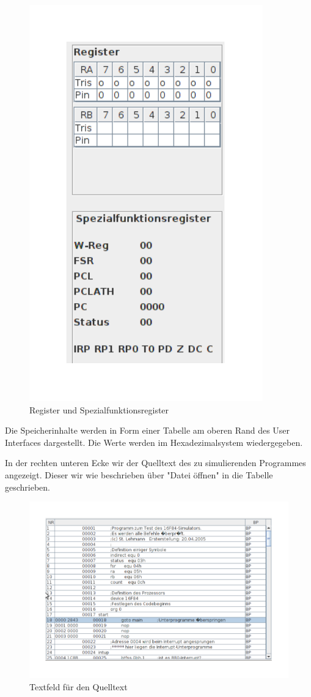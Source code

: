\begin{figure}[h]
\centering
\includegraphics[scale=0.5]{Bilder/Register.pdf}
\caption{Register und Spezialfunktionsregister}
\end{figure}

Die Speicherinhalte werden in Form einer Tabelle am oberen Rand des User Interfaces dargestellt. Die Werte werden im Hexadezimalsystem wiedergegeben. 


\noindent In der rechten unteren Ecke wir der Quelltext des zu simulierenden Programmes angezeigt. Dieser wir wie beschrieben über "Datei öffnen" in die Tabelle geschrieben.

\begin{figure}[h]
\centering
\includegraphics[scale=0.5]{Bilder/Text.pdf}
\caption{Textfeld für den Quelltext}
\end{figure}
